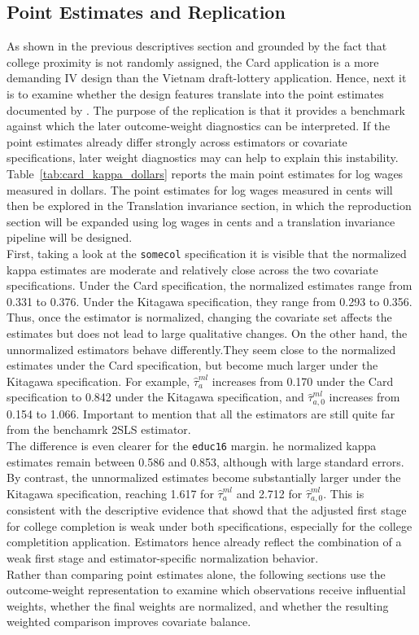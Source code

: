 \documentclass[12pt, a4paper, oneside]{article}
\theoremstyle{plain}
\theoremstyle{definition}
\begin{document}
\subsection{Point Estimates and Replication}
\label{subsec:card_point_estimates}
As shown in the previous descriptives section and grounded by the fact that college proximity is not randomly assigned, the Card application is a more demanding IV design than the Vietnam draft-lottery application.
Hence, next it is to examine
 whether the design features translate into the point estimates documented by \citet{sloczynski2025abadie}.
The purpose of the replication is that it provides a benchmark against which the later outcome-weight diagnostics can be interpreted. If the point estimates already differ strongly across estimators or covariate specifications, later weight diagnostics may can help to explain this instability. 
Table~\ref{tab:card_kappa_dollars} reports the main point estimates for log wages measured in dollars. 
The point estimates for log wages measured in cents will then be explored in the Translation invariance section, in which the reproduction section will be expanded using log wages in cents and a translation invariance pipeline will be designed. \\
First, taking a look at the \texttt{somecol}
specification it is visible that the normalized kappa estimates are moderate and relatively close across the two covariate specifications.
Under the Card specification, the normalized estimates range from 0.331 to 0.376. Under the Kitagawa specification, they range from 0.293 to 0.356. 
  Thus, once the estimator is normalized, changing the covariate set affects the estimates but does not lead to large qualitative changes.
  On the other hand, the unnormalized estimators behave differently.They seem close to the normalized estimates under the Card specification, but become much larger under the Kitagawa specification. For example, $\hat{\tau}^{ml}_{a}$ increases from 0.170 under the Card specification to 0.842 under the Kitagawa specification, and $\hat{\tau}^{ml}_{a,0}$ increases from 0.154 to 1.066. 
  Important to mention that all the estimators are still quite far from the benchamrk 2SLS estimator. \\
The difference is even clearer for the \texttt{educ16} margin. 
he normalized kappa estimates remain between 0.586 and 0.853, although with large standard errors. By contrast, the unnormalized estimates become substantially larger under the Kitagawa specification, reaching 1.617 for $\hat{\tau}^{ml}_{a}$ and 2.712 for $\hat{\tau}^{ml}_{a,0}$.
This is consistent with the descriptive evidence that showd that the 
adjusted first stage for college completion is weak under both specifications, especially for the college completition application. 
Estimators hence already reflect the combination of a weak first stage and estimator-specific normalization behavior.\\
Rather than comparing point estimates alone, the following sections use the outcome-weight representation to examine which observations receive influential weights, whether the final weights are normalized, and whether the resulting weighted comparison improves covariate balance.
\end{document}
